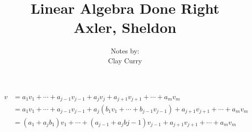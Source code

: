 \documentclass[11pt]{article} %
\title{Linear Algebra Done Right \\ Axler, Sheldon}
\author{Notes by:  \\ Clay Curry}
\date{}
\newcommand\lc[3]{#1_1 #2_1 + \cdots + #1_{#3} #2_{#3}}
\begin{document}
\begin{align*} 
v &= \lc{a}{v}{j-1} + a_j v_j + a_{j+1} v_{j+1} + \cdots + a_m v_m \\
&= \lc{a}{v}{j-1} + a_j (\lc{b}{v}{j-1}) + a_{j+1} v_{j+1} + \cdots + a_m v_m \\
&= (a_1+a_jb_1)v_1 + \cdots + (a_{j-1}+a_jb{j-1}) v_{j-1} + a_{j+1} v_{j+1} + \cdots + a_m v_m
\end{align*}
\end{document}

